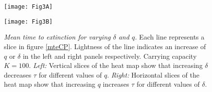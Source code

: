 \iffalse
\begin{figure}[h]
	\centering
	\subfloat[\emph{Varying $\delta$}]{\texttt{[image: Figure3-A]}\label{mte:delta}}
	\hfill
	\subfloat[\emph{Varying $q$} ]{\texttt{[image: Figure3-B]}\label{mte:q}}
	\caption{\emph{Mean time to extinction for varying $\delta$ and $q$.} Each line represents a slice in Figure \ref{mteCP}: Figure \ref{mte:delta} are vertical slices which show how, for different values of $q$, the $\delta$ affects $\tau$. Similarly Figure \ref{mte:q} are horizontal slices which show how, for different values of $\delta$, the $q$ affects $\tau$. As in Figure \ref{qsd}, lightness of the line indicates an increase of \ref{mte:delta} $q$ and \ref{mte:q} $\delta$}
	\label{mte}
\end{figure}
\fi
\begin{figure}[h]
	\centering
	\begin{minipage}{0.49\linewidth}
		\centering
		\texttt{[image: Fig3A]}
	\end{minipage}
	\begin{minipage}{0.49\linewidth}
		\centering
		\texttt{[image: Fig3B]}
	\end{minipage}
	\caption{\emph{Mean time to extinction for varying $\delta$ and $q$.} Each line represents a slice in figure \ref{mteCP}. Lightness of the line indicates an increase of $q$ or $\delta$ in the left and right panels respectively. Carrying capacity $K=100$. 
	\emph{Left:} Vertical slices of the heat map show that increasing $\delta$ decreases $\tau$ for different values of $q$. 
	\emph{Right:} Horizontal slices of the heat map show that increasing $q$ increases $\tau$ for different values of $\delta$. 
	}
	\label{mte}
\end{figure}

